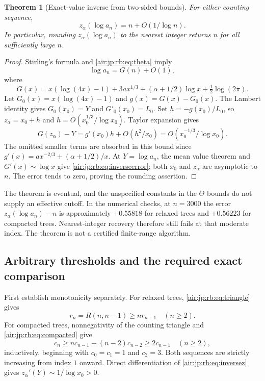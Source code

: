 \documentclass[11pt,letterpaper]{article}
\numberwithin{equation}{section}
\newtheorem{theorem}{Theorem}[section]
\theoremstyle{remark}
\begin{document}
\begin{theorem}[Exact-value inverse from two-sided bounds]\label{air:jp:rb:thm:inverse}
For either counting sequence,
\begin{equation}\label{air:jp:rb:eq:inverseerror}
 z_\alpha(\log a_n)=n+O(1/\log n).
\end{equation}
In particular, rounding $z_\alpha(\log a_n)$ to the nearest integer returns $n$ for all sufficiently large $n$.
\end{theorem}
\begin{proof}
Stirling's formula and \eqref{air:jp:rb:eq:theta} imply
\[
 \log a_n=G(n)+O(1),
\]
where
\[
 G(x)=x(\log(4x)-1)+3ax^{1/3}
      +(\alpha+1/2)\log x+\tfrac12\log(2\pi).
\]
Let $G_0(x)=x(\log(4x)-1)$ and $g(x)=G(x)-G_0(x)$. The Lambert identity gives $G_0(x_0)=Y$ and $G'_0(x_0)=L_0$. Set $h=-g(x_0)/L_0$, so $z_\alpha=x_0+h$ and $h=O(x_0^{1/3}/\log x_0)$. Taylor expansion gives
\[
 G(z_\alpha)-Y=g'(x_0)h+O(h^2/x_0)
 =O(x_0^{-1/3}/\log x_0).
\]
The omitted smaller terms are absorbed in this bound since
$g'(x)=ax^{-2/3}+(\alpha+1/2)/x$.
At $Y=\log a_n$, the mean value theorem and $G'(x)\sim\log x$ give \eqref{air:jp:rb:eq:inverseerror}; both $x_0$ and $z_\alpha$ are asymptotic to $n$. The error tends to zero, proving the rounding assertion.
\end{proof}

The theorem is eventual, and the unspecified constants in the $\Theta$ bounds do not supply an effective cutoff. In the numerical checks, at $n=3000$ the error $z_\alpha(\log a_n)-n$ is approximately $+0.55818$ for relaxed trees and $+0.56223$ for compacted trees. Nearest-integer recovery therefore still fails at that moderate index. The theorem is not a certified finite-range algorithm.

\subsection{Arbitrary thresholds and the required exact comparison}
First establish monotonicity separately. For relaxed trees, \eqref{air:jp:rb:eq:triangle} gives
\[
 r_n=R(n,n-1)\ge nr_{n-1}\quad(n\ge2).
\]
For compacted trees, nonnegativity of the counting triangle and \eqref{air:jp:rb:eq:compacted} give
\[
 c_n\ge nc_{n-1}-(n-2)c_{n-2}\ge2c_{n-1}\quad(n\ge2),
\]
inductively, beginning with $c_0=c_1=1$ and $c_2=3$. Both sequences are strictly increasing from index $1$ onward. Direct differentiation of \eqref{air:jp:rb:eq:inversez} gives
$z_\alpha'(Y)\sim1/\log x_0>0$.
\end{document}
